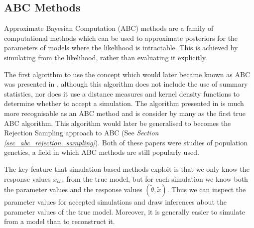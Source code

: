 \documentclass[11pt,a4paper]{article}
\theoremstyle{break}
\begin{document}
\subsection{ABC Methods}\label{sec_ABC_ABC_methods}

  \par Approximate Bayesian Computation (ABC) methods are a family of computational methods which can be used to approximate posteriors for the parameters of models where the likelihood is intractable. This is achieved by simulating from the likelihood, rather than evaluating it explicitly.

  \par The first algorithm to use the concept which would later became known as ABC was presented in \cite[]{inferring_coalescence_times_from_dna_sequence_data}, although this algorithm does not include the use of summary statistics, nor does it use a distance measures and kernel density functions to determine whether to accept a simulation. The algorithm presented in \cite[]{population_growth_of_human_Y_chromosomes} is much more recognisable as an ABC method and is consider by many as the first true ABC algorithm. This algorithm would later be generalised to becomes the Rejection Sampling approach to ABC (See \textit{Section \ref{sec_abc_rejection_sampling}}). Both of these papers were studies of population genetics, a field in which ABC methods are still popularly used.

  \par The key feature that simulation based methods exploit is that we only know the response values $x_{obs}$ from the true model, but for each simulation we know both the parameter values and the response values $(\tilde\theta,\tilde{x})$. Thus we can inspect the parameter values for accepted simulations and draw inferences about the parameter values of the true model. Moreover, it is generally easier to simulate from a model than to reconstruct it.
\end{document}
